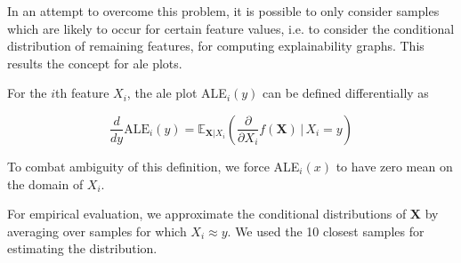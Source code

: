\documentclass[10pt,sigconf,letterpaper,dvipsnames]{acmart}
\newcommand\note[2]{{\color{#1}#2}}
\newcommand\todo[1]{{\note{red}{TODO: #1}}}
\begin{document}
In an attempt to overcome this problem, it is possible to only consider samples which are likely to occur for certain feature values, i.e. to consider the conditional distribution of remaining features, for computing explainability graphs. This results the concept for \gls{ale} plots.

For the $i$th feature $X_i$, the \gls{ale} plot ALE$_i(y)$ can be defined differentially as



\begin{equation}
\frac{d}{dy} \text{ALE}_i (y) = \mathbb E_{\boldsymbol X | X_i}\left(\frac{\partial}{\partial X_i} f(\boldsymbol X) \, \Big \vert \, X_i=y\right)
\end{equation}

To combat ambiguity of this definition, we force ALE$_i(x)$ to have zero mean on the domain of $X_i$.

For empirical evaluation, we approximate the conditional distributions of $\boldsymbol X$ by averaging over samples for which $X_i \approx y$. We used the 10  closest samples
for estimating the distribution.



\end{document}

